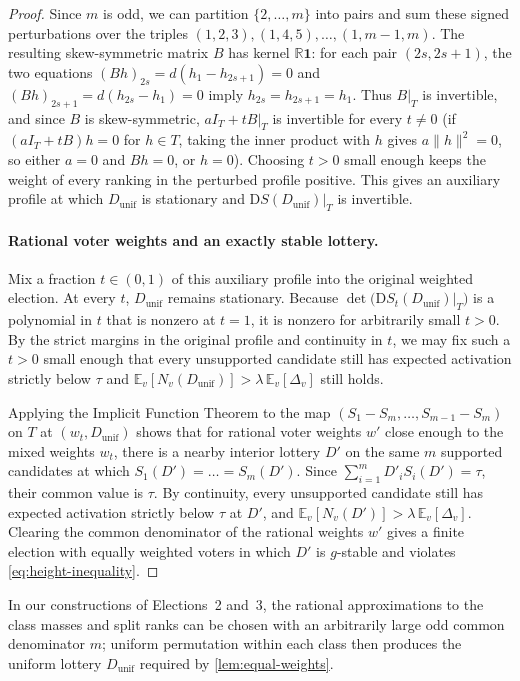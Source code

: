 \documentclass[11pt]{article}
\numberwithin{equation}{section}
\theoremstyle{plain}
\theoremstyle{definition}
\newcommand{\E}{\mathbb{E}}
\newcommand{\R}{\mathbb{R}}
\newcommand{\1}{\mathbf{1}}
\begin{document}
\begin{proof}
Since $m$ is odd, we can partition $\{2, \dots, m\}$ into pairs and sum these signed perturbations over the triples $(1, 2, 3), (1, 4, 5), \dots, (1, m - 1, m)$. The resulting skew-symmetric matrix $B$ has kernel $\R\1$: for each pair $(2s, 2s + 1)$, the two equations $(B h)_{2s} = d(h_1 - h_{2s+1}) = 0$ and $(B h)_{2s+1} = d(h_{2s} - h_1) = 0$ imply $h_{2s} = h_{2s+1} = h_1$. Thus $B|_T$ is invertible, and since $B$ is skew-symmetric, $a I_T + t B|_T$ is invertible for every $t \ne 0$ (if $(a I_T + t B)h = 0$ for $h \in T$, taking the inner product with $h$ gives $a\|h\|^2 = 0$, so either $a = 0$ and $B h = 0$, or $h = 0$). Choosing $t > 0$ small enough keeps the weight of every ranking in the perturbed profile positive. This gives an auxiliary profile at which $D_{\mathrm{unif}}$ is stationary and $\mathrm{D}S(D_{\mathrm{unif}})\big|_T$ is invertible.

\paragraph{Rational voter weights and an exactly stable lottery.}
Mix a fraction $t \in (0, 1)$ of this auxiliary profile into the original weighted election. At every $t$, $D_{\mathrm{unif}}$ remains stationary. Because $\det\bigl(\mathrm{D}S_t(D_{\mathrm{unif}})\big|_T\bigr)$ is a polynomial in $t$ that is nonzero at $t = 1$, it is nonzero for arbitrarily small $t > 0$. By the strict margins in the original profile and continuity in $t$, we may fix such a $t>0$ small enough that every unsupported candidate still has expected activation strictly below $\tau$ and $\E_v[N_v(D_{\mathrm{unif}})] > \lambda\,\E_v[\Delta_v]$ still holds.

Applying the Implicit Function Theorem to the map $(S_1 - S_m, \dots, S_{m-1} - S_m)$ on $T$ at $(w_t, D_{\mathrm{unif}})$ shows that for rational voter weights $w'$ close enough to the mixed weights $w_t$, there is a nearby interior lottery $D'$ on the same $m$ supported candidates at which $S_1(D') = \dots = S_m(D')$. Since $\sum_{i=1}^m D'_i S_i(D') = \tau$, their common value is $\tau$. By continuity, every unsupported candidate still has expected activation strictly below $\tau$ at $D'$, and $\E_v[N_v(D')] > \lambda\,\E_v[\Delta_v]$. Clearing the common denominator of the rational weights $w'$ gives a finite election with equally weighted voters in which $D'$ is $g$-stable and violates \cref{eq:height-inequality}.
\end{proof}

In our constructions of Elections~2 and~3, the rational approximations to the class masses and split ranks can be chosen with an arbitrarily large odd common denominator $m$; uniform permutation within each class then produces the uniform lottery $D_{\mathrm{unif}}$ required by \cref{lem:equal-weights}.
\end{document}
